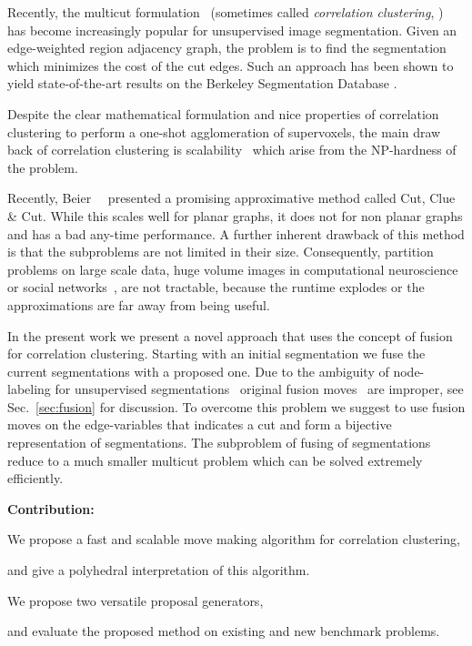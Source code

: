 \documentclass[10pt,twocolumn,letterpaper]{article}
\begin{document}
Recently, the multicut formulation~\cite{chopra_1993_mp, Kappes-2013-multicut}
(sometimes called \emph{correlation clustering}, \cite{bansal_2004_ml})
has become increasingly popular for unsupervised image segmentation.
%
Given an edge-weighted region adjacency graph,
the problem is to find the segmentation which
minimizes the cost of the cut edges.
Such an approach has been shown to yield
state-of-the-art results on the Berkeley Segmentation Database
\cite{andres_2011_iccv,yarkony_2012_eccv,alush_2013_simbad}.

Despite the clear mathematical formulation and nice properties of correlation clustering
to perform a one-shot agglomeration of supervoxels,
the main draw back of correlation clustering is scalability~\cite{nunez_iglesias_2013}
which arise from the NP-hardness of the problem.

Recently, Beier~\etal~\cite{Beier-2014} presented a promising 
approximative method called Cut, Clue \& Cut.
While this scales well for planar graphs, it does not for non planar graphs and has a bad any-time performance.
A further inherent drawback of this method is that the subproblems are not limited in their size.
%
Consequently, partition problems on large scale data, \eg
huge volume images in computational neuroscience~\cite{kroeger_2012_eccv}
or social networks~\cite{Leskovec-2010}, 
are not tractable, because the runtime explodes or the 
approximations are far away from being useful.

In the present work we present a novel approach that uses the concept of fusion for correlation clustering.
Starting with an initial segmentation we fuse the current segmentations with a proposed one.
Due to the ambiguity of node-labeling for unsupervised segmentations~\cite{} 
original fusion moves~\cite{Lempinski-2010} are improper, see Sec.~\ref{sec:fusion} for discussion.
To overcome this problem we suggest to use fusion moves on the edge-variables that indicates a cut and form a
bijective representation of segmentations.
The subproblem of fusing of segmentations reduce to a much smaller multicut problem which can be solved extremely efficiently.

\textbf{Contribution:}
\begin{inparaenum}[(i)]
\item We propose a fast and scalable move making algorithm for correlation clustering,
\item and give a polyhedral interpretation of this algorithm.
\item We propose two versatile proposal generators, 
\item and evaluate the proposed method on existing and new benchmark problems.
\end{inparaenum}
\end{document}
